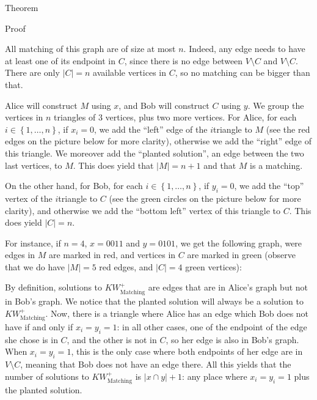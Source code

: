\documentclass[a4paper]{article}
\begin{document}
\begin{parag}{Theorem}
\begin{subparag}{Proof}
\begin{itemize}
            All matching of this graph are of size at most $n$. Indeed, any edge needs to have at least one of its endpoint in $C$, since there is no edge between $V \setminus C$ and $V \setminus C$. There are only $\left|C\right| = n$ available vertices in $C$, so no matching can be bigger than that.
        \end{itemize}

        Alice will construct $M$ using $x$, and Bob will construct $C$ using $y$. We group the vertices in $n$ triangles of $3$ vertices, plus two more vertices. For Alice, for each $i \in \left\{1, \ldots, n\right\}$, if $x_i = 0$, we add the ``left'' edge of the $i$\Th triangle to $M$ (see the red edges on the picture below for more clarity), otherwise we add the ``right'' edge of this triangle. We moreover add the ``planted solution'', an edge between the two last vertices, to $M$. This does yield that $\left|M\right| = n + 1$ and that $M$ is a matching.

        On the other hand, for Bob, for each $i \in \left\{1, \ldots, n\right\}$, if $y_i = 0$, we add the ``top'' vertex of the $i$\Th triangle to $C$ (see the green circles on the picture below for more clarity), and otherwise we add the ``bottom left'' vertex of this triangle to $C$. This does yield $\left|C\right| = n$.

        For instance, if $n = 4$, $x = 0011$ and $y = 0101$, we get the following graph, were edges in $M$ are marked in red, and vertices in $C$ are marked in green (observe that we do have $\left|M\right| = 5$ red edges, and $\left|C\right| = 4$ green vertices):

        By definition, solutions to $KW_{\text{Matching}}^+$ are edges that are in Alice's graph but not in Bob's graph. We notice that the planted solution will always be a solution to $KW_{\text{Matching}}^+$. Now, there is a triangle where Alice has an edge which Bob does not have if and only if $x_i = y_i = 1$: in all other cases, one of the endpoint of the edge she chose is in $C$, and the other is not in $C$, so her edge is also in Bob's graph. When $x_i = y_i = 1$, this is the only case where both endpoints of her edge are in $V \setminus C$, meaning that Bob does not have an edge there. All this yields that the number of solutions to $KW_{\text{Matching}}^+$ is $\left|x \cap y\right| + 1$: any place where $x_i = y_i = 1$ plus the planted solution. 


\end{subparag}
\end{parag}
\end{document}
